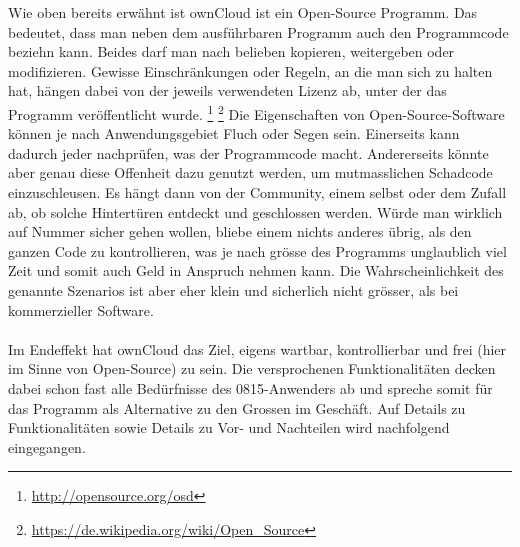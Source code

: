 Wie oben bereits erwähnt ist ownCloud ist ein Open-Source Programm. Das bedeutet, dass man neben dem ausführbaren Programm auch den Programmcode beziehn kann. Beides darf man nach belieben kopieren, weitergeben oder modifizieren. Gewisse Einschränkungen oder Regeln, an die man sich zu halten hat, hängen dabei von der jeweils verwendeten Lizenz ab, unter der das Programm veröffentlicht wurde.
\footnote{\url{http://opensource.org/osd}} 
\footnote{\url{https://de.wikipedia.org/wiki/Open_Source}} 
Die Eigenschaften von Open-Source-Software können je nach Anwendungsgebiet Fluch oder Segen sein. Einerseits kann dadurch jeder nachprüfen, was der Programmcode macht. Andererseits könnte aber genau diese Offenheit dazu genutzt werden, um mutmasslichen Schadcode einzuschleusen. Es hängt dann von der Community, einem selbst oder dem Zufall ab, ob solche Hintertüren entdeckt und geschlossen werden. Würde man wirklich auf Nummer sicher gehen wollen, bliebe einem nichts anderes übrig, als den ganzen Code zu kontrollieren, was je nach grösse des Programms unglaublich viel Zeit und somit auch Geld in Anspruch nehmen kann. Die Wahrscheinlichkeit des genannte Szenarios ist aber eher klein und sicherlich nicht grösser, als bei kommerzieller Software.
\\
\\
Im Endeffekt hat ownCloud das Ziel, eigens wartbar, kontrollierbar und frei (hier im Sinne von Open-Source) zu sein. Die versprochenen Funktionalitäten decken dabei schon fast alle Bedürfnisse des 0815-Anwenders ab und spreche somit für das Programm als Alternative zu den Grossen im Geschäft. Auf Details zu Funktionalitäten sowie Details zu Vor- und Nachteilen wird nachfolgend eingegangen.

